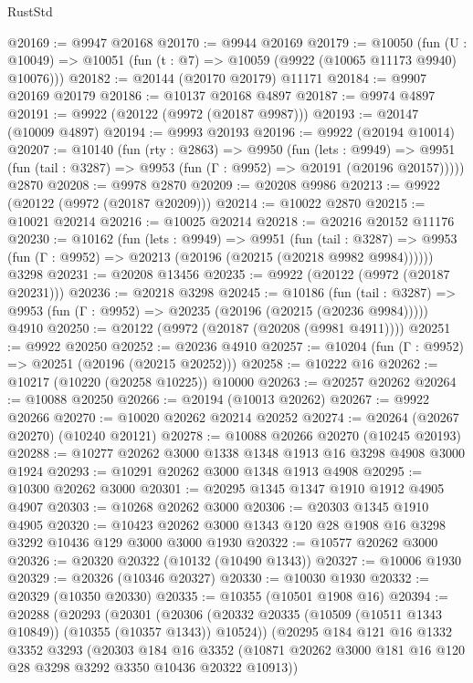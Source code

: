 \begin{lexlean}{RustStd}
\begin{coremodule}
@20169 := @9947 @20168
@20170 := @9944 @20169
@20179 := @10050
    (fun (U : @10049) => @10051 (fun (t : @7) => @10059 (@9922 (@10065 @11173 @9940) @10076)))
@20182 := @20144 (@20170 @20179) @11171
@20184 := @9907 @20169 @20179
@20186 := @10137 @20168 @4897
@20187 := @9974 @4897
@20191 := @9922 (@20122 (@9972 (@20187 @9987)))
@20193 := @20147 (@10009 @4897)
@20194 := @9993 @20193
@20196 := @9922 (@20194 @10014)
@20207 := @10140
    (fun (rty : @2863) =>
    @9950
      (fun (lets : @9949) =>
      @9951 (fun (tail : @3287) => @9953 (fun (Γ : @9952) => @20191 (@20196 @20157)))))
    @2870
@20208 := @9978 @2870
@20209 := @20208 @9986
@20213 := @9922 (@20122 (@9972 (@20187 @20209)))
@20214 := @10022 @2870
@20215 := @10021 @20214
@20216 := @10025 @20214
@20218 := @20216 @20152 @11176
@20230 := @10162
    (fun (lets : @9949) =>
    @9951
      (fun (tail : @3287) =>
      @9953 (fun (Γ : @9952) => @20213 (@20196 (@20215 (@20218 @9982 @9984))))))
    @3298
@20231 := @20208 @13456
@20235 := @9922 (@20122 (@9972 (@20187 @20231)))
@20236 := @20218 @3298
@20245 := @10186
    (fun (tail : @3287) => @9953 (fun (Γ : @9952) => @20235 (@20196 (@20215 (@20236 @9984)))))
    @4910
@20250 := @20122 (@9972 (@20187 (@20208 (@9981 @4911))))
@20251 := @9922 @20250
@20252 := @20236 @4910
@20257 := @10204 (fun (Γ : @9952) => @20251 (@20196 (@20215 @20252)))
@20258 := @10222 @16
@20262 := @10217 (@10220 (@20258 @10225)) @10000
@20263 := @20257 @20262
@20264 := @10088 @20250
@20266 := @20194 (@10013 @20262)
@20267 := @9922 @20266
@20270 := @10020 @20262 @20214 @20252
@20274 := @20264 (@20267 @20270) (@10240 @20121)
@20278 := @10088 @20266 @20270 (@10245 @20193)
@20288 := @10277 @20262 @3000 @1338 @1348 @1913 @16 @3298 @4908 @3000 @1924
@20293 := @10291 @20262 @3000 @1348 @1913 @4908
@20295 := @10300 @20262 @3000
@20301 := @20295 @1345 @1347 @1910 @1912 @4905 @4907
@20303 := @10268 @20262 @3000
@20306 := @20303 @1345 @1910 @4905
@20320 := @10423 @20262 @3000 @1343 @120 @28 @1908 @16 @3298 @3292 @10436 @129 @3000 @3000 @1930
@20322 := @10577 @20262 @3000
@20326 := @20320 @20322 (@10132 (@10490 @1343))
@20327 := @10006 @1930
@20329 := @20326 (@10346 @20327)
@20330 := @10030 @1930
@20332 := @20329 (@10350 @20330)
@20335 := @10355 (@10501 @1908 @16)
@20394 := @20288
    (@20293
      (@20301
        (@20306 (@20332 @20335 (@10509 (@10511 @1343 @10849)) (@10355 (@10357 @1343)) @10524))
        (@20295
          @184
          @121
          @16
          @1332
          @3352
          @3293
          (@20303
            @184
            @16
            @3352
            (@10871 @20262 @3000 @181 @16 @120 @28 @3298 @3292 @3350 @10436 @20322 @10913))

\end{coremodule}
\end{lexlean}
